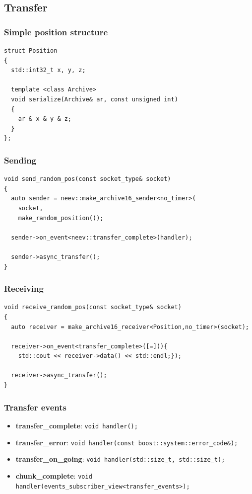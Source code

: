\documentclass[xcolor=dvipsnames]{beamer}
\begin{document}
\subsection{Transfer}

\begin{frame}[fragile]
\frametitle{Simple position structure}
\begin{lstlisting}
struct Position
{
  std::int32_t x, y, z;

  template <class Archive>
  void serialize(Archive& ar, const unsigned int)
  {
    ar & x & y & z;
  }
};
\end{lstlisting}
\end{frame}

\begin{frame}[fragile]
\frametitle{Sending}
\begin{lstlisting}
void send_random_pos(const socket_type& socket)
{
  auto sender = neev::make_archive16_sender<no_timer>(
    socket, 
    make_random_position());

  sender->on_event<neev::transfer_complete>(handler);

  sender->async_transfer();
}
\end{lstlisting}
\end{frame}

\begin{frame}[fragile]
\frametitle{Receiving}
\begin{lstlisting}
void receive_random_pos(const socket_type& socket)
{
  auto receiver = make_archive16_receiver<Position,no_timer>(socket);
  
  receiver->on_event<transfer_complete>([=](){
    std::cout << receiver->data() << std::endl;});

  receiver->async_transfer();
}
\end{lstlisting}
\end{frame}

\begin{frame}
\frametitle{Transfer events}
\begin{itemize}
  \item \textbf{transfer\_complete}: \lstinline{void handler();}
  \item \textbf{transfer\_error}: \lstinline{void handler(const boost::system::error_code&);}
  \item \textbf{transfer\_on\_going}: \lstinline{void handler(std::size_t, std::size_t);}
  \item \textbf{chunk\_complete}: \lstinline{void handler(events_subscriber_view<transfer_events>);}
\end{itemize}
\end{frame}
\end{document}
